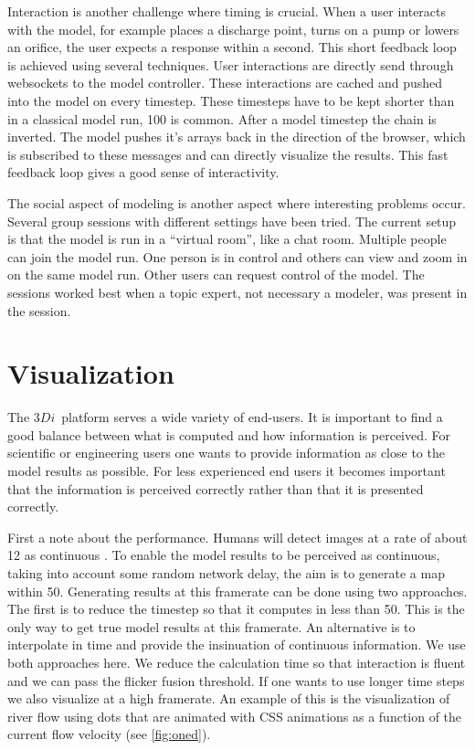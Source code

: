 \documentclass[a4paper]{article}
\DeclareRobustCommand{\threedi}{$3Di$~}
\begin{document}
Interaction is another challenge where timing is crucial. When a user interacts with the model, for example places a discharge point, turns on a pump or lowers an orifice, the user expects a response within a second. This short feedback loop is achieved using several techniques. User interactions are directly send through websockets \citep{Hickson2012} to the model controller. These interactions are cached and pushed into the model on every timestep. These timesteps have to be kept shorter than in a classical model run, \si{100}{\mili\second} is common. After a model timestep the chain is inverted. The model pushes it's arrays back in the direction of the browser, which is subscribed to these messages and can directly visualize the results. This fast feedback loop gives a good sense of interactivity.

The social aspect of modeling is another aspect where interesting problems occur. Several group sessions with different settings have been tried. The current setup is that the model is run in a ``virtual room'', like a chat room. Multiple people can join the model run. One person is in control and others can view and zoom in on the same model run. Other users can request control of the model. The sessions worked best when a topic expert, not necessary a modeler, was present in the session.

\section{Visualization}
The \threedi platform serves a wide variety of end-users. It is important to find a good balance between what is computed and how information is perceived. For scientific or engineering users one wants to provide information as close to the model results as possible. For less experienced end users it becomes important that the information is perceived correctly rather than that it is presented correctly.

First a note about the performance. Humans will detect images at a rate of about \si{12}{\per\second} as continuous \citep{Landis1954}. To enable the model results to be perceived as continuous, taking into account some random network delay, the aim is to generate a map within \si{50}{\mili\second}. Generating results at this framerate can be done using two approaches. The first is to reduce the timestep so that it computes in less than \si{50}{\mili\second}. This is the only way to get true model results at this framerate. An alternative is to interpolate in time and provide the insinuation of continuous information. We use both approaches here. We reduce the calculation time so that interaction is fluent and we can pass the flicker fusion threshold. If one wants to use longer time steps we also visualize at a high framerate. An example of this is the visualization of river flow using dots that are animated with \ac{CSS} animations as a function of the current flow velocity (see \autoref{fig:oned}).
\end{document}
